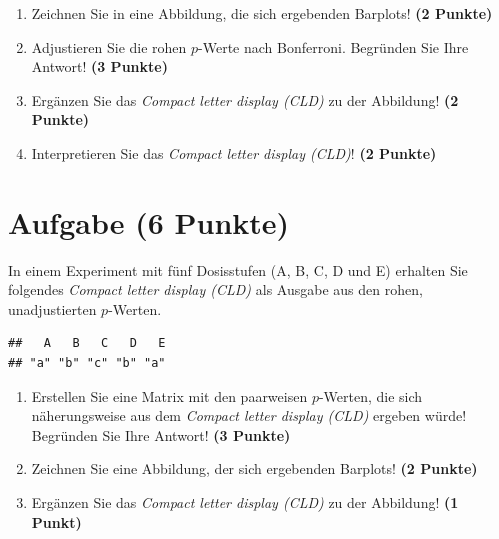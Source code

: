 \documentclass[a4paper, 10pt]{scrartcl}\usepackage[]{graphicx}\usepackage[]{xcolor}
\makeatletter
\newenvironment{kframe}{%
 \def\at@end@of@kframe{}%
 \ifinner\ifhmode%
  \def\at@end@of@kframe{\end{minipage}}%
  \begin{minipage}{\columnwidth}%
 \fi\fi%
 \def\FrameCommand##1{\hskip\@totalleftmargin \hskip-\fboxsep
 \colorbox{shadecolor}{##1}\hskip-\fboxsep
     \hskip-\linewidth \hskip-\@totalleftmargin \hskip\columnwidth}%
 \MakeFramed {\advance\hsize-\width
   \@totalleftmargin\z@ \linewidth\hsize
   \@setminipage}}%
 {\par\unskip\endMakeFramed%
 \at@end@of@kframe}
\newenvironment{knitrout}{}{} %
\makeatother
\begin{document}
\begin{enumerate}
\item Zeichnen Sie in eine Abbildung, die sich ergebenden Barplots! \textbf{(2 Punkte)}
\item Adjustieren Sie die rohen $p$-Werte nach Bonferroni. Begr{\"u}nden Sie Ihre Antwort! \textbf{(3 Punkte)}
\item Erg{\"a}nzen Sie das \textit{Compact letter display (CLD)} zu der
  Abbildung! \textbf{(2 Punkte)}
\item Interpretieren Sie das \textit{Compact letter display (CLD)}! \textbf{(2 Punkte)} 
\end{enumerate}

 
\clearpage

\section{Aufgabe \hfill (6 Punkte)}

In einem Experiment mit f{\"u}nf Dosisstufen (A, B, C, D und E) erhalten Sie
folgendes \textit{Compact letter display (CLD)} als \Rlogo Ausgabe aus den rohen, unadjustierten $p$-Werten. 



\begin{knitrout}
\color{fgcolor}\begin{kframe}
\begin{verbatim}
##   A   B   C   D   E 
## "a" "b" "c" "b" "a"
\end{verbatim}
\end{kframe}
\end{knitrout}

\begin{enumerate}
\item Erstellen Sie eine Matrix mit den paarweisen $p$-Werten, die sich
  n{\"a}herungsweise aus dem \textit{Compact letter display (CLD)} ergeben w{\"u}rde! Begr{\"u}nden Sie Ihre Antwort! \textbf{(3 Punkte)}
\item Zeichnen Sie eine Abbildung, der sich ergebenden Barplots! \textbf{(2 Punkte)}
\item Erg{\"a}nzen Sie das \textit{Compact letter display (CLD)} zu der
  Abbildung! \textbf{(1 Punkt)}
\end{enumerate}

 
\clearpage
\end{document}
